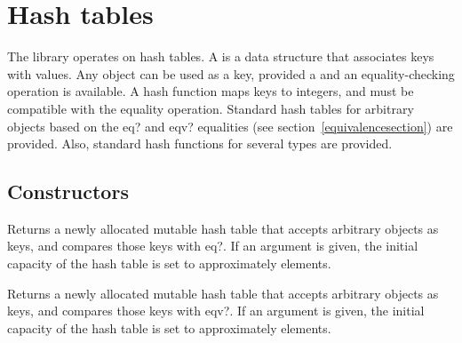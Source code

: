 \section{Hash tables}
\label{hashtablesection}

The  library operates on hash tables.
A  is a data structure that associates keys with values.
Any object can be used as a key, provided a 
and an equality-checking operation is available.  A hash function maps
keys to integers, and must be compatible with the equality operation.  
Standard hash tables for arbitrary objects based on the {\cf eq?} and 
{\cf eqv?} equalities (see section~\ref{equivalencesection}) are provided.  
Also, standard hash functions for several types are provided.

\subsection{Constructors}


\begin{entry}{%
}

Returns a newly allocated mutable hash table that accepts arbitrary objects as keys, 
and compares those keys with {\cf eq?}. If an argument is given, the initial 
capacity of the hash table is set to approximately  elements.

\end{entry}

\begin{entry}{%
}

Returns a newly allocated mutable hash table that accepts arbitrary objects as keys, 
and compares those keys with {\cf eqv?}.
If an argument is given, the initial 
capacity of the hash table is set to approximately  elements.

\end{entry}

